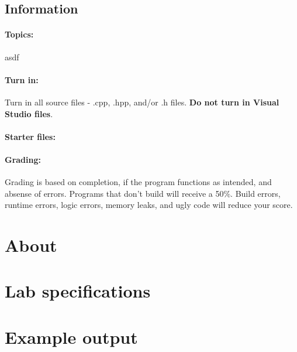 
\newcommand{\laClass}       {CS 250}
\newcommand{\laSemester}    {Spring 2018}
\newcommand{\laChapter}     {}
\newcommand{\laType}        {Lab}
\newcommand{\laAssignment}  {1}
\newcommand{\laPoints}      {5}
\newcommand{\laTitle}       {Doing a thing}
\setcounter{chapter}{1}
\setcounter{section}{1}
\addtocounter{section}{-1}
\toggletrue{answerkey}
\togglefalse{answerkey}




    \subsection*{Information}
    
        \paragraph{Topics:} asdf

        \paragraph{Turn in:}
            Turn in all source files - .cpp, .hpp, and/or .h files.
            \textbf{Do not turn in Visual Studio files}.

        \paragraph{Starter files:}

        \paragraph{Grading:}
            Grading is based on completion, if the program functions as intended,
            and absense of errors. Programs that don't build will receive a 50\%.{}
            Build errors, runtime errors, logic errors, memory leaks, and ugly code will reduce your score.

        \tableofcontents

    \newpage

    \section{About}

    \section{Lab specifications}

    \section{Example output}


